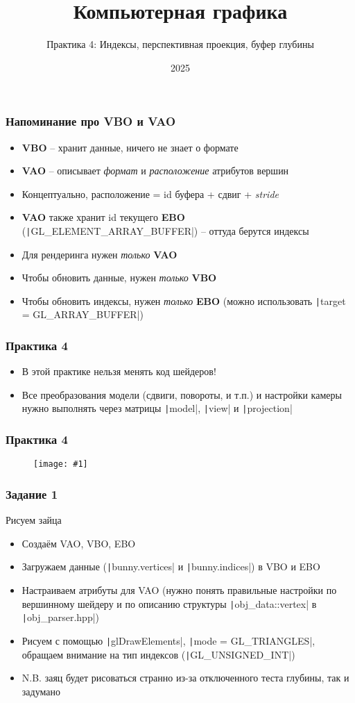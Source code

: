\documentclass[10pt]{beamer}
\title{Компьютерная графика}
\subtitle{Практика 4: Индексы, перспективная проекция, буфер глубины}
\date{2025}
\newcommand{\slideimage}[1]{
  \begin{figure}
    \begin{adjustbox}{width=\textwidth, totalheight=\textheight-2\baselineskip-2\baselineskip,keepaspectratio}
      \texttt{[image: \#1]}
    \end{adjustbox}
  \end{figure}
}
\begin{document}
\frame{\titlepage}

\begin{frame}[fragile]
\frametitle{Напоминание про VBO и VAO}
\begin{itemize}
\item \textbf{VBO} -- хранит данные, ничего не знает о формате
\item \textbf{VAO} -- описывает \textit{формат} и \textit{расположение} атрибутов вершин
\item Концептуально, расположение = id буфера + сдвиг + \textit{stride}
\item \textbf{VAO} также хранит id текущего \textbf{EBO} (\texttt|GL_ELEMENT_ARRAY_BUFFER|) -- оттуда берутся индексы
\item Для рендеринга нужен \textit{только} \textbf{VAO}
\item Чтобы обновить данные, нужен \textit{только} \textbf{VBO}
\item Чтобы обновить индексы, нужен \textit{только} \textbf{EBO} (можно использовать \texttt|target = GL_ARRAY_BUFFER|)
\end{itemize}
\end{frame}

\begin{frame}[fragile]
\frametitle{Практика 4}
\begin{itemize}
\item В этой практике нельзя менять код шейдеров!
\item Все преобразования модели (сдвиги, повороты, и т.п.) и настройки камеры нужно выполнять через матрицы \texttt|model|, \texttt|view| и \texttt|projection|
\end{itemize}
\end{frame}

\begin{frame}[fragile]
\frametitle{Практика 4}
\slideimage{0.png}
\end{frame}

\begin{frame}[fragile]
\frametitle{Задание 1}
Рисуем зайца
\begin{itemize}
\item Создаём VAO, VBO, EBO
\item Загружаем данные (\texttt|bunny.vertices| и \texttt|bunny.indices|) в VBO и EBO
\item Настраиваем атрибуты для VAO (нужно понять правильные настройки по вершинному шейдеру и по описанию структуры \texttt|obj_data::vertex| в \texttt|obj_parser.hpp|)
\item Рисуем с помощью \texttt|glDrawElements|, \texttt|mode = GL_TRIANGLES|, обращаем внимание на тип индексов (\texttt|GL_UNSIGNED_INT|)
\item N.B. заяц будет рисоваться странно из-за отключенного теста глубины, так и задумано
\end{itemize}
\end{frame}
\end{document}
